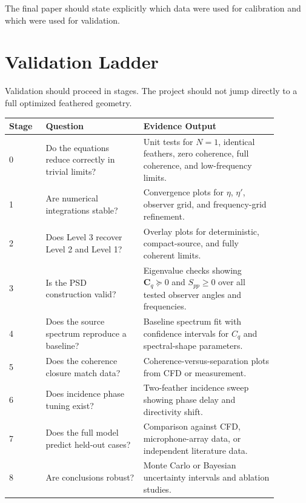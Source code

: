 \documentclass[11pt]{article}
\newcommand{\mat}[1]{\bm{#1}}
\begin{document}
The final paper should state explicitly which data were used for calibration and which were used for validation.

\section{Validation Ladder}

Validation should proceed in stages. The project should not jump directly to a full optimized feathered geometry.

\begin{longtable}{p{0.12\linewidth} p{0.32\linewidth} p{0.44\linewidth}}
\toprule
\textbf{Stage} & \textbf{Question} & \textbf{Evidence Output} \\
\midrule
\endhead

0
&
Do the equations reduce correctly in trivial limits?
&
Unit tests for $N=1$, identical feathers, zero coherence, full coherence, and low-frequency limits.
\\

1
&
Are numerical integrations stable?
&
Convergence plots for $\eta$, $\eta'$, observer grid, and frequency-grid refinement.
\\

2
&
Does Level 3 recover Level 2 and Level 1?
&
Overlay plots for deterministic, compact-source, and fully coherent limits.
\\

3
&
Is the PSD construction valid?
&
Eigenvalue checks showing $\mat{C}_q\succeq0$ and $S_{pp}\geq0$ over all tested observer angles and frequencies.
\\

4
&
Does the source spectrum reproduce a baseline?
&
Baseline spectrum fit with confidence intervals for $C_q$ and spectral-shape parameters.
\\

5
&
Does the coherence closure match data?
&
Coherence-versus-separation plots from CFD or measurement.
\\

6
&
Does incidence phase tuning exist?
&
Two-feather incidence sweep showing phase delay and directivity shift.
\\

7
&
Does the full model predict held-out cases?
&
Comparison against CFD, microphone-array data, or independent literature data.
\\

8
&
Are conclusions robust?
&
Monte Carlo or Bayesian uncertainty intervals and ablation studies.
\\

\bottomrule
\end{longtable}
\end{document}
